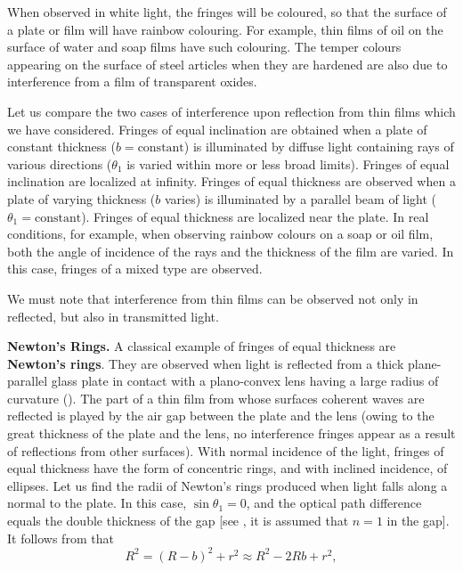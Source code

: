 When observed in white light, the fringes will be coloured, so that the surface of a plate or film will have rainbow colouring.
For example, thin films of oil on the surface of water and soap films have such colouring.
The temper colours appearing on the surface of steel articles when they are hardened are also due to interference from a film of transparent oxides.

Let us compare the two cases of interference upon reflection from thin films which we have considered.
Fringes of equal inclination are obtained when a
plate of constant thickness ($b=\text{constant}$) is illuminated by diffuse light containing
rays of various directions ($\theta_1$ is varied within more or less broad limits).
Fringes of equal inclination are localized at infinity.
Fringes of equal thickness are observed when a plate of varying thickness ($b$ varies) is illuminated by a parallel beam of light ($\theta_1=\text{constant}$).
Fringes of equal thickness are localized near the plate.
In real conditions, for example, when observing rainbow colours on a soap or oil film, both the angle of incidence of the rays and the thickness of the film are varied.
In this case, fringes of a mixed type are observed.

We must note that interference from thin films can be observed not only in reflected, but also in transmitted light.

\textbf{Newton's Rings.}
A classical example of fringes of equal thickness
are \textbf{Newton's rings}.
They are observed when light is reflected from a thick plane-parallel glass plate in contact with a plano-convex lens having a large radius of curvature ().
The part of a thin film from whose surfaces coherent waves are reflected is played by the air gap between the plate and the lens (owing to the great thickness of the plate and the lens, no interference fringes appear as a result of reflections from other surfaces).
With normal incidence of the light, fringes of equal thickness have the form of concentric rings, and with inclined incidence, of ellipses.
Let us find the radii of Newton's rings produced when light falls along a normal to the plate.
In this case, $\sin\theta_1=0$, and the optical path difference equals the double thickness of the gap [see , it is assumed that $n=1$ in the gap].
It follows from  that
\begin{equation}\label{eq:17_40}
    R^2 = (R - b)^2 + r^2 \approx R^2 - 2Rb + r^2,
\end{equation}

